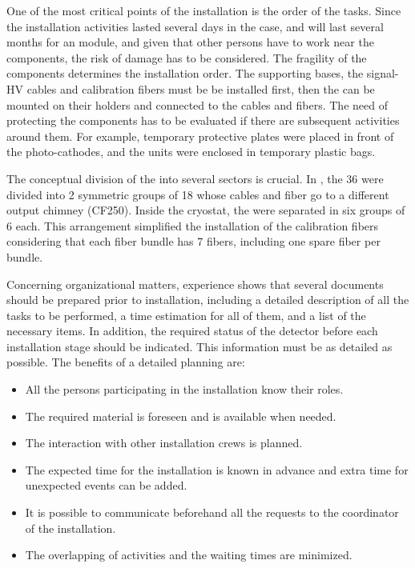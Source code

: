 One of the most critical points of the installation is the order of the tasks. Since the installation activities lasted several days in the  case, and will last several months for an  module, and given that other persons have to work near the  components, the risk of damage has to be considered. The fragility of the components determines the installation order. The  supporting bases, the signal-HV  cables and calibration fibers must be be installed first, then the  can be mounted on their holders and connected to the cables and fibers. The need of protecting the components has to be evaluated if there are subsequent activities around them. For example,  temporary protective plates were placed in front of the   photo-cathodes, and the  units were enclosed in temporary plastic bags. 

The conceptual division of the   into several sectors is crucial. In , the \num{36}  were divided into \num{2} symmetric groups of 18  whose cables and fiber go to a different output chimney (CF250). Inside the cryostat, the  were separated in six groups of \num{6}  each. This arrangement simplified the installation of the calibration fibers considering that each fiber bundle has \num{7} fibers, including one spare fiber per bundle. 

Concerning organizational matters,  experience shows that several documents should be prepared prior to installation, including a detailed description of all the tasks to be performed, a time estimation for all of them, and a list of the necessary items. In addition, the required status of the detector before each installation stage should be indicated. This information must be as detailed as possible. The benefits of a detailed planning are:

\begin{itemize}
\item All the persons participating in the  installation know their roles.
\item The required material is foreseen and is available when needed.
\item The interaction with other installation crews is planned.
\item The expected time for the installation is known in advance and extra time for unexpected events can be added.
\item It is possible to communicate beforehand all the requests to the coordinator of the installation.
\item The overlapping of activities and the waiting times are minimized. 
\end{itemize}

